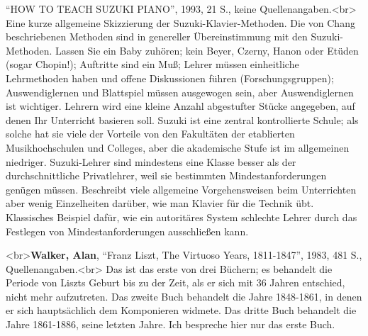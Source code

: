 \enquote{HOW TO TEACH SUZUKI PIANO}, 1993, 21 S., keine Quellenangaben.<br>  Eine kurze allgemeine Skizzierung der Suzuki-Klavier-Methoden.
Die von Chang beschriebenen Methoden sind in genereller Übereinstimmung mit den Suzuki-Methoden.
Lassen Sie ein Baby zuhören; kein Beyer, Czerny, Hanon oder Etüden (sogar Chopin!); Auftritte sind ein Muß; Lehrer müssen einheitliche Lehrmethoden haben und offene Diskussionen führen (Forschungsgruppen); Auswendiglernen und Blattspiel müssen ausgewogen sein, aber Auswendiglernen ist wichtiger.
Lehrern wird eine kleine Anzahl abgestufter Stücke angegeben, auf denen Ihr Unterricht basieren soll.
Suzuki ist eine zentral kontrollierte Schule; als solche hat sie viele der Vorteile von den Fakultäten der etablierten Musikhochschulen und Colleges, aber die akademische Stufe ist im allgemeinen niedriger.
Suzuki-Lehrer sind mindestens eine Klasse besser als der durchschnittliche Privatlehrer, weil sie bestimmten Mindestanforderungen genügen müssen.
Beschreibt viele allgemeine Vorgehensweisen beim Unterrichten aber wenig Einzelheiten darüber, wie man Klavier für die Technik übt.
Klassisches Beispiel dafür, wie ein autoritäres System schlechte Lehrer durch das Festlegen von Mindestanforderungen ausschließen kann.


\label{Walker}

<br>\textbf{Walker, Alan}, \enquote{Franz Liszt, The Virtuoso Years, 1811-1847}, 1983, 481 S., Quellenangaben.<br>
Das ist das erste von drei Büchern; es behandelt die Periode von Liszts Geburt bis zu der Zeit, als er sich mit 36 Jahren entschied, nicht mehr aufzutreten.
Das zweite Buch behandelt die Jahre 1848-1861, in denen er sich hauptsächlich dem Komponieren widmete.
Das dritte Buch behandelt die Jahre 1861-1886, seine letzten Jahre.
Ich bespreche hier nur das erste Buch.

